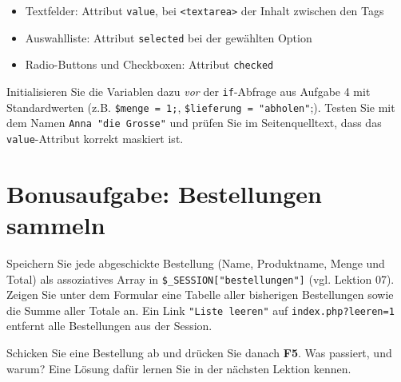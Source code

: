 \documentclass[a4paper,12pt]{article}
\begin{document}
\begin{itemize}
    \item Textfelder: Attribut \texttt{value}, bei \texttt{<textarea>} der Inhalt zwischen den Tags
    \item Auswahlliste: Attribut \texttt{selected} bei der gewählten Option
    \item Radio-Buttons und Checkboxen: Attribut \texttt{checked}
\end{itemize}

Initialisieren Sie die Variablen dazu \emph{vor} der \texttt{if}-Abfrage aus Aufgabe 4 mit Standardwerten (z.B. \texttt{\$menge = 1;}, \texttt{\$lieferung = "{}abholen"{}};). Testen Sie mit dem Namen \texttt{Anna "{}die Grosse"{}} und prüfen Sie im Seitenquelltext, dass das \texttt{value}-Attribut korrekt maskiert ist.

\section{Bonusaufgabe: Bestellungen sammeln}

Speichern Sie jede abgeschickte Bestellung (Name, Produktname, Menge und Total) als assoziatives Array in \texttt{\$\_SESSION["{}bestellungen"{}]} (vgl. Lektion 07). Zeigen Sie unter dem Formular eine Tabelle aller bisherigen Bestellungen sowie die Summe aller Totale an. Ein Link \texttt{"{}Liste leeren"{}} auf \texttt{index.php?leeren=1} entfernt alle Bestellungen aus der Session.

Schicken Sie eine Bestellung ab und drücken Sie danach \textbf{F5}. Was passiert, und warum? Eine Lösung dafür lernen Sie in der nächsten Lektion kennen.
\end{document}
